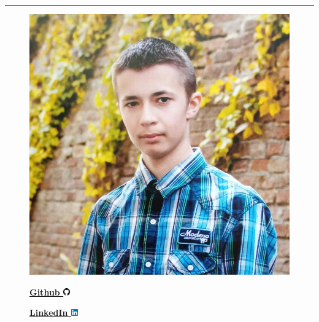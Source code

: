 \hypersetup{
    colorlinks=false,
    urlbordercolor=white
}


\par\noindent\rule{\textwidth}{0.1mm}

\begin{figure}
    \begin{flushright}
        \includegraphics[width=0.2\linewidth]{images/profile.jpeg}

        {
            
            \vspace{0.2cm}
            \textbf{
                {\href{https://github.com/LostHopes}{Github \includegraphics[width=0.30cm]{images/github.png}}}
            }

            \vspace{0.2cm}
            \textbf{
                {\href{https://www.linkedin.com/in/arsen-melnychuk-840b5126b/}{LinkedIn \includegraphics[width=0.30cm]{images/linkedin.png}}}
            }
        }
    \end{flushright}
\end{figure}
